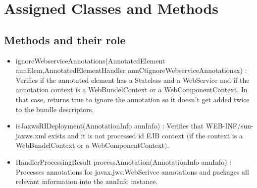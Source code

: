 \section{Assigned Classes and Methods}

	\subsection{Methods and their role}
		\begin{itemize}
			\item ignoreWebserviceAnnotations(AnnotatedElement annElem,AnnotatedElementHandler annCtignoreWebserviceAnnotationsx) : Verifies if the annotated element has a Stateless and a WebService and if the annotation
			context is a WebBundelContext or a WebComponentContext. In that case, returns true to ignore the annotation so it doesn't get added twice to the bundle descriptors.
			\item isJaxwsRIDeployment(AnnotationInfo annInfo) : Verifies that WEB-INF/sun-jaxws.xml exists and it is not processed id EJB context $($if the context is a WebBundelContext or a WebComponentContext$)$. 
			\item HandlerProcessingResult processAnnotation(AnnotationInfo annInfo) : Processes annotations for javax.jws.WebSerivce annotations and packages all relevant information into the annInfo instance. 
			\end{itemize}
